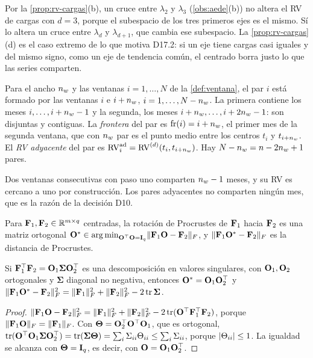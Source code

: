 Por la \cref{prop:rv-cargas}(b), un cruce entre $\lambda_2$ y $\lambda_3$ (\cref{obs:aede}(b)) no
altera el RV de cargas con $d=3$, porque el subespacio de los tres primeros ejes es el mismo. Sí lo
altera un cruce entre $\lambda_d$ y $\lambda_{d+1}$, que cambia ese subespacio. La
\cref{prop:rv-cargas}(d) es el caso extremo de lo que motiva D17.2: si un eje tiene cargas casi
iguales y del mismo signo, como un eje de tendencia común, el centrado borra justo lo que las
series comparten.

\begin{definicion}\label{def:pares}
Para el ancho $n_{w}$ y las ventanas $i=1,\dots,N$ de la \cref{def:ventana}, el par $i$ está formado
por las ventanas $i$ e $i+n_{w}$, $i=1,\dots,N-n_{w}$. La primera contiene los meses
$i,\dots,i+n_{w}-1$ y la segunda, los meses $i+n_{w},\dots,i+2n_{w}-1$: son disjuntas y contiguas. La
\emph{frontera} del par es $\operatorname{fr}(i)=i+n_{w}$, el primer mes de la segunda ventana, que con $n_{w}$ par
es el punto medio entre los centros $t_i$ y $t_{i+n_{w}}$. El \emph{RV adyacente} del par es
$\operatorname{RV}^{\mathrm{ad}}_{i}=\operatorname{RV}^{(d)}(t_i,t_{i+n_{w}})$. Hay $N-n_{w}=n-2n_{w}+1$ pares.
\end{definicion}

Dos ventanas consecutivas con paso uno comparten $n_{w}-1$ meses, y su RV es cercano a uno por
construcción. Los pares adyacentes no comparten ningún mes, que es la razón de la decisión D10.

\begin{definicion}\label{def:procrustes}
Para $\mathbf{F}_1,\mathbf{F}_2\in\mathbb{R}^{m\times q}$ centradas, la rotación de Procrustes de $\mathbf{F}_1$ hacia
$\mathbf{F}_2$ es una matriz ortogonal $\mathbf{O}^\ast\in\operatorname*{arg\,min}_{\mathbf{O}^{\top}\mathbf{O}=\mathbf{I}_q}\lVert \mathbf{F}_1\mathbf{O}-\mathbf{F}_2\rVert_{F}$, y
$\lVert \mathbf{F}_1\mathbf{O}^\ast-\mathbf{F}_2\rVert_{F}$ es la distancia de Procrustes.
\end{definicion}

\begin{proposicion}\label{prop:procrustes}
Si $\mathbf{F}_1^{\top}\mathbf{F}_2=\mathbf{O}_1\boldsymbol{\Sigma}\mathbf{O}_2^{\top}$ es una descomposición en valores singulares,
con $\mathbf{O}_1,\mathbf{O}_2$ ortogonales y $\boldsymbol{\Sigma}$ diagonal no negativa, entonces
$\mathbf{O}^\ast=\mathbf{O}_1\mathbf{O}_2^{\top}$ y
$\lVert \mathbf{F}_1\mathbf{O}^\ast-\mathbf{F}_2\rVert_{F}^2=\lVert \mathbf{F}_1\rVert_{F}^2+\lVert \mathbf{F}_2\rVert_{F}^2-2\operatorname{tr}\boldsymbol{\Sigma}$.
\end{proposicion}

\begin{proof}
$\lVert \mathbf{F}_1\mathbf{O}-\mathbf{F}_2\rVert_{F}^2=\lVert \mathbf{F}_1\rVert_{F}^2+\lVert \mathbf{F}_2\rVert_{F}^2-2\operatorname{tr}(\mathbf{O}^{\top}\mathbf{F}_1^{\top}\mathbf{F}_2)$, porque
$\lVert \mathbf{F}_1\mathbf{O}\rVert_{F}=\lVert \mathbf{F}_1\rVert_{F}$. Con $\boldsymbol{\Theta}=\mathbf{O}_2^{\top}\mathbf{O}^{\top}\mathbf{O}_1$, que es ortogonal,
$\operatorname{tr}(\mathbf{O}^{\top}\mathbf{O}_1\boldsymbol{\Sigma}\mathbf{O}_2^{\top})=\operatorname{tr}(\boldsymbol{\Sigma}\boldsymbol{\Theta})=
\sum_i\Sigma_{ii}\Theta_{ii}\le\sum_i\Sigma_{ii}$, porque $\lvert \Theta_{ii}\rvert\le1$. La igualdad se alcanza con
$\boldsymbol{\Theta}=\mathbf{I}_q$, es decir, con $\mathbf{O}=\mathbf{O}_1\mathbf{O}_2^{\top}$.
\end{proof}

